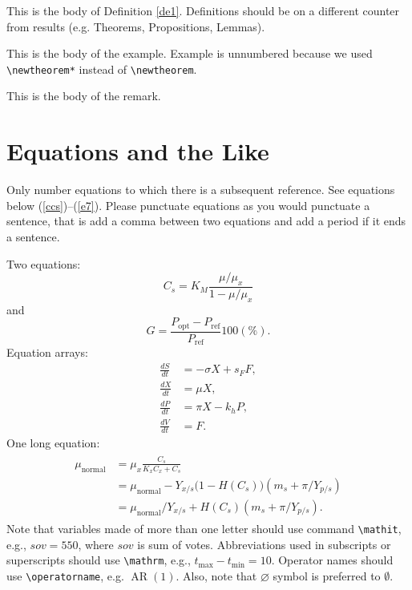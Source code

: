 \documentclass[rbe,fleqn]{econbr}
\begin{document}
\begin{definition}\label{de1}
This is the body of Definition \ref{de1}. Definitions should be on a different counter from results (e.g. Theorems, Propositions, Lemmas).
\end{definition}

\begin{example}
This is the body of the example. Example is unnumbered because we used \verb|\newtheorem*| instead of \verb|\newtheorem|.
\end{example}

\begin{remark}
This is the body of the remark. 
\end{remark}

\section{Equations and the Like}
Only number equations to which there is a subsequent reference. See equations below (\ref{ccs})--(\ref{e7}). Please punctuate equations as you would punctuate a sentence, that is add a comma between two equations and add a period if it ends a sentence.

Two equations:
\begin{equation}
    C_{s}  =  K_{M} \frac{\mu/\mu_{x}}{1-\mu/\mu_{x}} \label{ccs}
\end{equation}
and
\begin{equation}
    G = \frac{P_{\mathrm{opt}} - P_{\mathrm{ref}}}{P_{\mathrm{ref}}}  100(\%).
\end{equation}
Equation arrays:
\begin{align}
  \frac{dS}{dt} & = - \sigma X + s_{F} F,\\
  \frac{dX}{dt} & =   \mu    X,\\
  \frac{dP}{dt} & =   \pi    X - k_{h} P,\\
  \frac{dV}{dt} & =   F.
\end{align}
One long equation:
\begin{align}
\label{e7}
\begin{split}
\mu_{\text{normal}} & = \mu_{x} \frac{C_{s}}{K_{x}C_{x}+C_{s}} \\
                      & = \mu_{\text{normal}} - Y_{x/s}\bigl(1-H(C_{s})\bigr)(m_{s}+\pi /Y_{p/s})\\
                      & = \mu_{\text{normal}}/Y_{x/s}+ H(C_{s}) (m_{s}+ \pi /Y_{p/s}).
\end{split}
\end{align}
Note that variables made of more than one letter should use command \verb|\mathit|, e.g., $\mathit{sov}=550$, where $\mathit{sov}$ is sum of votes. Abbreviations used in subscripts or superscripts should use \verb|\mathrm|, e.g., $t_{\mathrm{max}}-t_{\mathrm{min}} =10$. Operator names should use \verb|\operatorname|, e.g. $\operatorname{AR}(1)$. Also, note that $\varnothing$ symbol is preferred to $\emptyset$.
\end{document}
